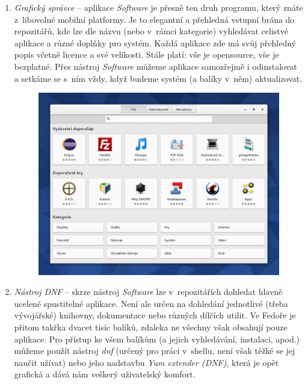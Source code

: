 \begin{enumerate}
\item \emph{Grafický správce} -- aplikace \emph{Software} je přesně ten druh programu, který znáte z~libovolné mobilní platformy. Je to elegantní a přehledná vstupní brána do repozitářů, kde lze dle názvu (nebo v~rámci kategorie) vyhledávat celistvé aplikace a různé doplňky pro systém. Každá aplikace zde má svůj přehledný popis včetně licence a své velikosti. Stále platí: vše je opensource, vše je bezplatné. Přes nástroj \emph{Software} můžeme aplikace samozřejmě i odinstalovat a setkáme se s~ním vždy, když budeme systém (a balíky v~něm) aktualizovat.

\begin{figure}[t]
\begin{center}
\includegraphics[width=\textwidth]{img/software}
 \label{fig:software}
\end{center}
\end{figure}

\item \emph{Nástroj DNF} -- skrze nástroj \emph{Software} lze v~repozitářích dohledat hlavně ucelené spustitelné aplikace. Není ale určen na dohledání jednotlivé (třeba vývojářské) knihovny, dokumentace nebo různých dílčích utilit. Ve Fedoře je přitom takřka dvacet tisíc balíků, zdaleka ne všechny však obsahují pouze aplikace. Pro přístup ke všem balíkům (a jejich vyhledávání, instalaci, apod.) můžeme použít nástroj \emph{dnf} (určený pro práci v~shellu, není však těžké se jej naučit užívat) nebo jeho nadstavbu \emph{Yum extender (DNF)}, která je opět grafická a dává nám veškerý uživatelský komfort.
\end{enumerate}

